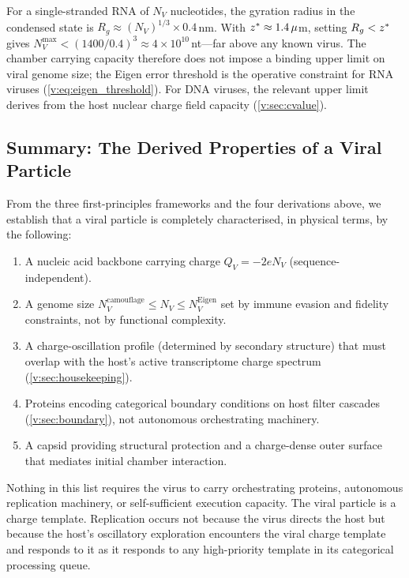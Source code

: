 For a single-stranded RNA of $N_V$ nucleotides, the gyration radius in the condensed state is $R_g \approx (N_V)^{1/3} \times 0.4$\,nm. With $z^{*} \approx 1.4\,\mu$m, setting $R_g < z^{*}$ gives $N_V^{\max} < (1400/0.4)^3 \approx 4 \times 10^{10}$\,nt---far above any known virus. The chamber carrying capacity therefore does not impose a binding upper limit on viral genome size; the Eigen error threshold is the operative constraint for RNA viruses (\cref{v:eq:eigen_threshold}). For DNA viruses, the relevant upper limit derives from the host nuclear charge field capacity (\cref{v:sec:cvalue}).

\subsection{Summary: The Derived Properties of a Viral Particle}

From the three first-principles frameworks and the four derivations above, we establish that a viral particle is completely characterised, in physical terms, by the following:

\begin{enumerate}[(1)]
  \item A nucleic acid backbone carrying charge $Q_V = -2e N_V$ (sequence-independent).
  \item A genome size $N_V^{\mathrm{camouflage}} \leq N_V \leq N_V^{\mathrm{Eigen}}$ set by immune evasion and fidelity constraints, not by functional complexity.
  \item A charge-oscillation profile (determined by secondary structure) that must overlap with the host's active transcriptome charge spectrum (\cref{v:sec:housekeeping}).
  \item Proteins encoding categorical boundary conditions on host filter cascades (\cref{v:sec:boundary}), not autonomous orchestrating machinery.
  \item A capsid providing structural protection and a charge-dense outer surface that mediates initial chamber interaction.
\end{enumerate}

Nothing in this list requires the virus to carry orchestrating proteins, autonomous replication machinery, or self-sufficient execution capacity. The viral particle is a charge template. Replication occurs not because the virus directs the host but because the host's oscillatory exploration encounters the viral charge template and responds to it as it responds to any high-priority template in its categorical processing queue.

